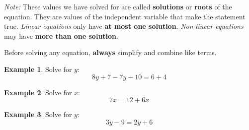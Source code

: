 \documentclass[addpoints,12pt]{exam}
\theoremstyle{definition}
\theoremstyle{break}
\theoremstyle{break}
\newtheorem{example}{Example}[subsection]
\begin{document}
\noindent \emph{Note:} These values we have solved for are called \textbf{solutions} or \textbf{roots} of the equation. They are values of the independent variable that make the statement true. \emph{Linear equations} only have \textbf{at most one solution}. \emph{Non-linear equations} may have \textbf{more than one solution}.

\vspace{.15in}
\noindent Before solving any equation, \textbf{always} simplify and combine like terms.
\vspace{.15in}

\begin{example}
Solve for $y$: \[8y + 7 - 7y - 10 = 6 + 4\]
\vspace{2in}
\end{example}

\newpage

\begin{example}
Solve for $x$: \[7x = 12 + 6x\]
\vspace{2in}
\end{example}

\begin{example}
Solve for $y$: \[3y - 9 = 2y + 6\]
\end{example}
\end{document}

